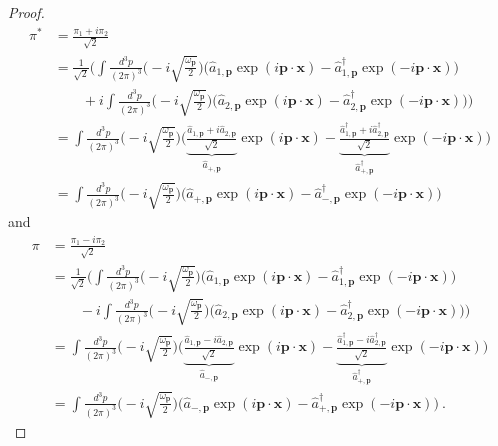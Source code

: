 \begin{proof}
\begin{equation*}
\begin{aligned}
            \pi^* & = \frac{\pi_1 + i \pi_2}{\sqrt{2}} \\ & = \frac{1}{\sqrt{2}} \Big (\int \frac{d^3 p}{{(2\pi)}^3} \Big ( - i \sqrt{\frac{\omega_{\mathbf p}}{2}} \Big ) \Big (\hat a_{1, \mathbf p} \exp(i \mathbf p \cdot \mathbf x) - \hat a_{1, \mathbf p}^\dagger \exp(- i \mathbf p \cdot \mathbf x) \Big) \\ & \qquad + i \int \frac{d^3 p}{{(2\pi)}^3} \Big ( - i \sqrt{\frac{\omega_{\mathbf p}}{2}} \Big ) \Big (\hat a_{2, \mathbf p} \exp(i \mathbf p \cdot \mathbf x) - \hat a_{2, \mathbf p}^\dagger \exp(- i \mathbf p \cdot \mathbf x) \Big) \Big) \\ & = \int \frac{d^3 p}{{(2\pi)}^3} \Big ( - i \sqrt{\frac{\omega_{\mathbf p}}{2}} \Big ) \Big ( \underbrace{\frac{\hat a_{1, \mathbf p} + i \hat a_{2, \mathbf p}}{\sqrt{2}}}_{\hat a_{+, \mathbf p}} \exp(i \mathbf p \cdot \mathbf x) - \underbrace{\frac{\hat a_{1, \mathbf p}^\dagger + i \hat a_{2, \mathbf p}^\dagger}{\sqrt{2}}}_{\hat a_{+, \mathbf p}^\dagger} \exp(- i \mathbf p \cdot \mathbf x) \Big) \\ & = \int \frac{d^3 p}{{(2\pi)}^3} \Big ( - i \sqrt{\frac{\omega_{\mathbf p}}{2}} \Big ) \Big ( \hat a_{+, \mathbf p} \exp(i \mathbf p \cdot \mathbf x) - \hat a_{-, \mathbf p}^\dagger \exp(- i \mathbf p \cdot \mathbf x) \Big)  
        \end{aligned}
        \end{equation*}
        and 
        \begin{equation*}
        \begin{aligned}
            \pi & = \frac{\pi_1 - i \pi_2}{\sqrt{2}} \\ & = \frac{1}{\sqrt{2}} \Big (\int \frac{d^3 p}{{(2\pi)}^3} \Big ( - i \sqrt{\frac{\omega_{\mathbf p}}{2}} \Big ) \Big (\hat a_{1, \mathbf p} \exp(i \mathbf p \cdot \mathbf x) - \hat a_{1, \mathbf p}^\dagger \exp(- i \mathbf p \cdot \mathbf x) \Big) \\ & \qquad - i \int \frac{d^3 p}{{(2\pi)}^3} \Big ( - i \sqrt{\frac{\omega_{\mathbf p}}{2}} \Big ) \Big (\hat a_{2, \mathbf p} \exp(i \mathbf p \cdot \mathbf x) - \hat a_{2, \mathbf p}^\dagger \exp(- i \mathbf p \cdot \mathbf x) \Big) \Big) \\ & = \int \frac{d^3 p}{{(2\pi)}^3} \Big ( - i \sqrt{\frac{\omega_{\mathbf p}}{2}} \Big ) \Big ( \underbrace{\frac{\hat a_{1, \mathbf p} - i \hat a_{2, \mathbf p}}{\sqrt{2}}}_{\hat a_{-, \mathbf p}} \exp(i \mathbf p \cdot \mathbf x) - \underbrace{\frac{\hat a_{1, \mathbf p}^\dagger - i \hat a_{2, \mathbf p}^\dagger}{\sqrt{2}}}_{\hat a_{+, \mathbf p}^\dagger} \exp(- i \mathbf p \cdot \mathbf x) \Big) \\ & = \int \frac{d^3 p}{{(2\pi)}^3} \Big ( - i \sqrt{\frac{\omega_{\mathbf p}}{2}} \Big ) \Big ( \hat a_{-, \mathbf p} \exp(i \mathbf p \cdot \mathbf x) - \hat a_{+, \mathbf p}^\dagger \exp(- i \mathbf p \cdot \mathbf x) \Big)  ~.

\end{aligned}
\end{equation*}
\end{proof}

